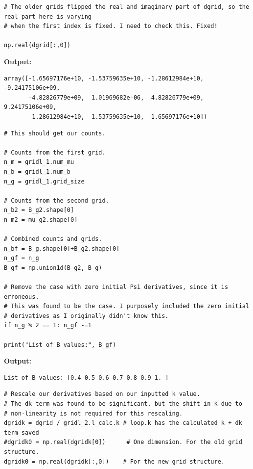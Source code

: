 \documentclass{article}
\begin{document}
\begin{lstlisting}
# The older grids flipped the real and imaginary part of dgrid, so the real part here is varying
# when the first index is fixed. I need to check this. Fixed!

np.real(dgrid[:,0])\end{lstlisting}

\textbf{Output:}\begin{verbatim}
array([-1.65697176e+10, -1.53759635e+10, -1.28612984e+10, -9.24175106e+09,
       -4.82826779e+09,  1.01969682e-06,  4.82826779e+09,  9.24175106e+09,
        1.28612984e+10,  1.53759635e+10,  1.65697176e+10])
\end{verbatim}

\begin{lstlisting}
# This should get our counts. 

# Counts from the first grid.
n_m = gridl_1.num_mu
n_b = gridl_1.num_b
n_g = gridl_1.grid_size

# Counts from the second grid.
n_b2 = B_g2.shape[0]
n_m2 = mu_g2.shape[0]

# Combined counts and grids.
n_bf = B_g.shape[0]+B_g2.shape[0]
n_gf = n_g
B_gf = np.union1d(B_g2, B_g)

# Remove the case with zero initial Psi derivatives, since it is erroneous.
# This was found to be the case. I purposely included the zero initial
# derivatives as I originally didn't know this.
if n_g % 2 == 1: n_gf -=1 

print("List of B values:", B_gf)\end{lstlisting}

\textbf{Output:}\begin{verbatim}
List of B values: [0.4 0.5 0.6 0.7 0.8 0.9 1. ]

\end{verbatim}

\begin{lstlisting}
# Rescale our derivatives based on our inputted k value. 
# The dk term was found to be significant, but the shift in k due to 
# non-linearity is not required for this rescaling.
dgridk = dgrid / gridl_2.l_calc.k # loop.k has the calculated k + dk term saved
#dgridk0 = np.real(dgridk[0])      # One dimension. For the old grid structure.
dgridk0 = np.real(dgridk[:,0])    # For the new grid structure.\end{lstlisting}
\end{document}
